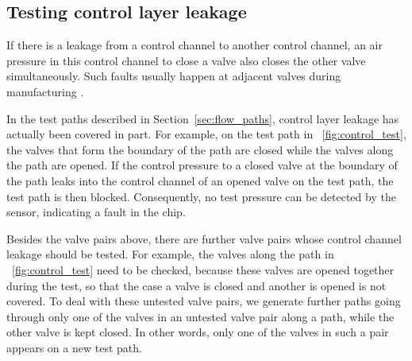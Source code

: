 \subsection{Testing control layer leakage}
\label{sec:control_layer_test}

If there is a leakage from a control channel to another control channel,
an air pressure in this control channel 
to close a valve also closes the other valve simultaneously. 
Such faults usually happen at adjacent valves during manufacturing
\cite{HuYHC14}.
%
%

In the test paths described in Section~\ref{sec:flow_paths}, 
control layer leakage has actually been covered in part. For example, 
on the test path in \figname~\ref{fig:control_test}, the valves that
form the boundary of the path are closed while the valves along the path are
opened. If the control pressure to a closed valve at the boundary of the path 
leaks into the control channel of an opened valve on the test path, 
the test path is then blocked. Consequently, no test pressure 
can be detected by the sensor, indicating a fault in the chip. 

Besides the valve pairs above, there are further valve pairs whose control channel
leakage should be tested. For example, the valves 
along the path in \figname~\ref{fig:control_test} need to be checked,
because these valves are opened together during the test, so that the case a
valve is closed and another is opened is not covered. To deal with these
untested valve pairs, we generate further paths going through only one of the valves
in an untested valve pair along a path, while the other valve is kept closed. 
In other words, only one of the valves in such a pair appears on a new test path. 

